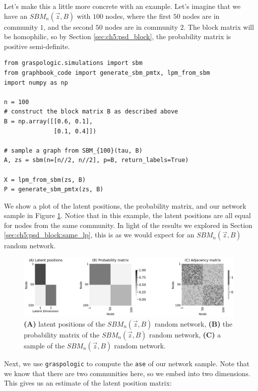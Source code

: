Let's make this a little more concrete with an example. Let's imagine that we have an $SBM_n(\vec z, B)$ with $100$ nodes, where the first $50$ nodes are in community $1$, and the second $50$ nodes are in community $2$. The block matrix will be homophilic, so by Section \ref{sec:ch5:psd_block}, the probability matrix is positive semi-definite.


\begin{lstlisting}[style=python]
from graspologic.simulations import sbm
from graphbook_code import generate_sbm_pmtx, lpm_from_sbm
import numpy as np

n = 100
# construct the block matrix B as described above
B = np.array([[0.6, 0.1], 
              [0.1, 0.4]])

# sample a graph from SBM_{100}(tau, B)
A, zs = sbm(n=[n//2, n//2], p=B, return_labels=True)

X = lpm_from_sbm(zs, B)
P = generate_sbm_pmtx(zs, B)
\end{lstlisting}

We show a plot of the latent positions, the probability matrix, and our network sample in Figure \ref{fig:ch6:ase:ex}. Notice that in this example, the latent positions are all equal for nodes from the same community. In light of the results we explored in Section \ref{sec:ch5:psd_block:same_lp}, this is as we would expect for an $SBM_n(\vec z, B)$ random network.

\begin{figure}
    \centering
    \includegraphics[width=\linewidth]{representations/ch6/Images/ase_sbm_ex.png}
    \caption[$SBM_n(\vec z, B)$ example for ASE]{\textbf{(A)} latent positions of the $SBM_n(\vec z, B)$ random network, \textbf{(B)} the probability matrix of the $SBM_n(\vec z, B)$ random network, \textbf{(C)} a sample of the $SBM_n(\vec z, B)$ random network.}
    \label{fig:ch6:ase:ex}
\end{figure}

Next, we use \texttt{graspologic} to compute the \texttt{ase} of our network sample. Note that we know that there are two communities here, so we embed into two dimensions. This gives us an estimate of the latent position matrix:

